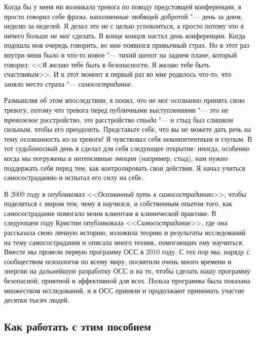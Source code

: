 	Когда бы у меня ни возникала тревога по поводу предстоящей конференции, я просто говорил себе фразы, наполненные любящей добротой "--- день за днем, неделю за неделей. Я делал это не с целью успокоиться, а просто потому что я ничего больше не мог сделать. В конце концов настал день конференции. Когда подошла моя очередь говорить, во мне появился привычный страх. Но в этот раз внутри меня было и что-то новое "--- тихий шепот на заднем плане, который говорил: <<Я желаю тебе быть в безопасности. Я желаю тебе быть счастливым>>. И в этот момент в первый раз во мне родилось что-то, что заняло место страха "--- \emph{самосострадание}.
	
	Размышляя об этом впоследствии, я понял, что не мог осознанно принять свою тревогу, потому что тревога перед публичными выступлениями "--- это не \emph{тревожное} расстройство, это расстройство \emph{стыда} "--- и стыд был слишком сильным, чтобы его преодолеть. Представьте себе, что вы не можете дать речь на тему осознанность из-за тревоги! Я чувствовал себя некомпетентным и глупым. В тот судьбоносный день я сделал для себя следующее открытие: иногда, особенно когда мы погружены в интенсивные эмоции (например, стыд), нам нужно поддержать себя перед тем, как контролировать свои действия. Я начал учиться самосостраданию и испытал его силу на себе.
	
	В 2009 году я опубликовал <<\emph{Осознанный путь к самосостраданию}>>, чтобы поделиться с миром тем, чему я научился, и собственным опытом того, как самосострадание помогало моим клиентам в клинической практике. В следующем году Кристин опубликовала <<\emph{Самосострадание}>>, где она рассказала свою личную историю, изложила теорию и результаты исследований на тему самосострадания и описала много техник, помогающих ему научиться. Вместе мы провели первую программу ОСС в 2010 году. С тех пор мы, наряду с сообществом психологов по всему миру, посвятили очень много времени и энергии на дальнейшую разработку ОСС и на то, чтобы сделать нашу программу безопасной, приятной и эффективной для всех. Польза программы была показана множеством исследований, и в ОСС приняли и продолжают принимать участие десятки тысяч людей. 
	
	
	\subsection*{Как работать с этим пособием}
	
